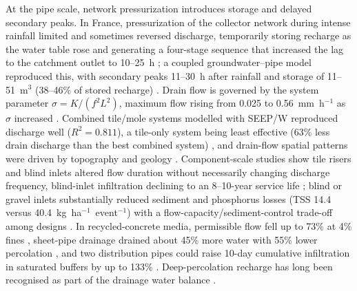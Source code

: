 \documentclass[11pt]{article}
\begin{document}
At the pipe scale, network pressurization introduces storage and delayed secondary peaks. In France, pressurization of the collector network during intense rainfall limited and sometimes reversed discharge, temporarily storing recharge as the water table rose and generating a four-stage sequence that increased the lag to the catchment outlet to 10--25~h \parencite{Henine2010}; a coupled groundwater--pipe model reproduced this, with secondary peaks 11--30~h after rainfall and storage of 11--51~m$^3$ (38--46\% of stored recharge) \parencite{Henine2014}. Drain flow is governed by the system parameter $\sigma=K/(f^2L^2)$, maximum flow rising from 0.025 to 0.56~mm~h$^{-1}$ as $\sigma$ increased \parencite{Bouarfa2000}. Combined tile/mole systems modelled with SEEP/W reproduced discharge well ($R^2=0.811$), a tile-only system being least effective (63\% less drain discharge than the best combined system) \parencite{Tuohy2018}, and drain-flow spatial patterns were driven by topography and geology \parencite{Mahmood2023}. Component-scale studies show tile risers and blind inlets altered flow duration without necessarily changing discharge frequency, blind-inlet infiltration declining to an 8--10-year service life \parencite{Williams2020,Williams2019}; blind or gravel inlets substantially reduced sediment and phosphorus losses (TSS 14.4 versus 40.4~kg~ha$^{-1}$~event$^{-1}$) with a flow-capacity/sediment-control trade-off among designs \parencite{Feyereisen2015b,Li2017b}. In recycled-concrete media, permissible flow fell up to 73\% at 4\% fines \parencite{McCulloch2017}, sheet-pipe drainage drained about 45\% more water with 55\% lower percolation \parencite{Tamura2021,Arif2021}, and two distribution pipes could raise 10-day cumulative infiltration in saturated buffers by up to 133\% \parencite{Jaynes2019b}. Deep-percolation recharge has long been recognised as part of the drainage water balance \parencite{BOOKMAN1959}.
\end{document}
